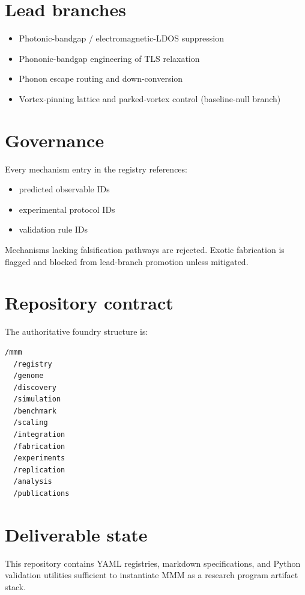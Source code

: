 \documentclass[11pt]{article}
\begin{document}
\section*{Lead branches}
\begin{itemize}
    \item Photonic-bandgap / electromagnetic-LDOS suppression
    \item Phononic-bandgap engineering of TLS relaxation
    \item Phonon escape routing and down-conversion
    \item Vortex-pinning lattice and parked-vortex control (baseline-null branch)
\end{itemize}

\section*{Governance}
Every mechanism entry in the registry references:
\begin{itemize}
    \item predicted observable IDs
    \item experimental protocol IDs
    \item validation rule IDs
\end{itemize}
Mechanisms lacking falsification pathways are rejected. Exotic fabrication is flagged and blocked from lead-branch promotion unless mitigated.

\section*{Repository contract}
The authoritative foundry structure is:
\begin{verbatim}
/mmm
  /registry
  /genome
  /discovery
  /simulation
  /benchmark
  /scaling
  /integration
  /fabrication
  /experiments
  /replication
  /analysis
  /publications
\end{verbatim}

\section*{Deliverable state}
This repository contains YAML registries, markdown specifications, and Python validation utilities sufficient to instantiate MMM as a research program artifact stack.
\end{document}
